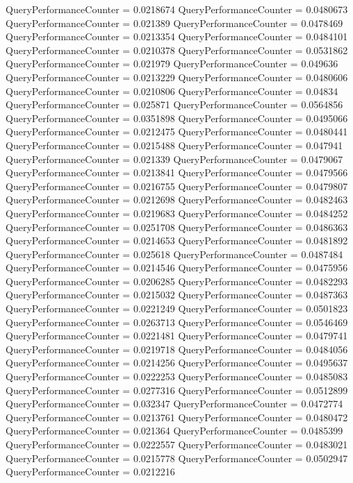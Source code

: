 \documentclass[9pt]{article}
\theoremstyle{plain}
\theoremstyle{definition}
\theoremstyle{remark}
\numberwithin{equation}{section}
\begin{document}
QueryPerformanceCounter  =  0.0218674
QueryPerformanceCounter  =  0.0480673
QueryPerformanceCounter  =  0.021389
QueryPerformanceCounter  =  0.0478469
QueryPerformanceCounter  =  0.0213354
QueryPerformanceCounter  =  0.0484101
QueryPerformanceCounter  =  0.0210378
QueryPerformanceCounter  =  0.0531862
QueryPerformanceCounter  =  0.021979
QueryPerformanceCounter  =  0.049636
QueryPerformanceCounter  =  0.0213229
QueryPerformanceCounter  =  0.0480606
QueryPerformanceCounter  =  0.0210806
QueryPerformanceCounter  =  0.04834
QueryPerformanceCounter  =  0.025871
QueryPerformanceCounter  =  0.0564856
QueryPerformanceCounter  =  0.0351898
QueryPerformanceCounter  =  0.0495066
QueryPerformanceCounter  =  0.0212475
QueryPerformanceCounter  =  0.0480441
QueryPerformanceCounter  =  0.0215488
QueryPerformanceCounter  =  0.047941
QueryPerformanceCounter  =  0.021339
QueryPerformanceCounter  =  0.0479067
QueryPerformanceCounter  =  0.0213841
QueryPerformanceCounter  =  0.0479566
QueryPerformanceCounter  =  0.0216755
QueryPerformanceCounter  =  0.0479807
QueryPerformanceCounter  =  0.0212698
QueryPerformanceCounter  =  0.0482463
QueryPerformanceCounter  =  0.0219683
QueryPerformanceCounter  =  0.0484252
QueryPerformanceCounter  =  0.0251708
QueryPerformanceCounter  =  0.0486363
QueryPerformanceCounter  =  0.0214653
QueryPerformanceCounter  =  0.0481892
QueryPerformanceCounter  =  0.025618
QueryPerformanceCounter  =  0.0487484
QueryPerformanceCounter  =  0.0214546
QueryPerformanceCounter  =  0.0475956
QueryPerformanceCounter  =  0.0206285
QueryPerformanceCounter  =  0.0482293
QueryPerformanceCounter  =  0.0215032
QueryPerformanceCounter  =  0.0487363
QueryPerformanceCounter  =  0.0221249
QueryPerformanceCounter  =  0.0501823
QueryPerformanceCounter  =  0.0263713
QueryPerformanceCounter  =  0.0546469
QueryPerformanceCounter  =  0.0221481
QueryPerformanceCounter  =  0.0479741
QueryPerformanceCounter  =  0.0219718
QueryPerformanceCounter  =  0.0484056
QueryPerformanceCounter  =  0.0214256
QueryPerformanceCounter  =  0.0495637
QueryPerformanceCounter  =  0.0222253
QueryPerformanceCounter  =  0.0485083
QueryPerformanceCounter  =  0.0277316
QueryPerformanceCounter  =  0.0512899
QueryPerformanceCounter  =  0.032347
QueryPerformanceCounter  =  0.0472774
QueryPerformanceCounter  =  0.0213761
QueryPerformanceCounter  =  0.0480472
QueryPerformanceCounter  =  0.021364
QueryPerformanceCounter  =  0.0485399
QueryPerformanceCounter  =  0.0222557
QueryPerformanceCounter  =  0.0483021
QueryPerformanceCounter  =  0.0215778
QueryPerformanceCounter  =  0.0502947
QueryPerformanceCounter  =  0.0212216
\end{document}
